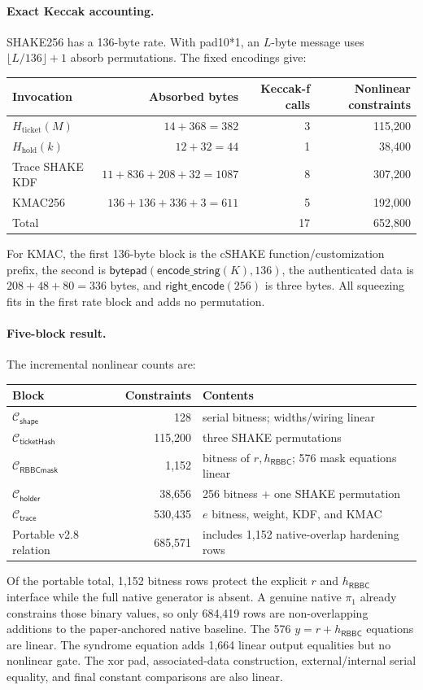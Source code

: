 \documentclass[11pt]{article}
\newcommand{\RBBC}{\mathsf{RBBC}}
\begin{document}
\paragraph{Exact Keccak accounting.}
SHAKE256 has a 136-byte rate.  With pad10*1, an $L$-byte message uses
$\lfloor L/136\rfloor+1$ absorb permutations.  The fixed encodings give:
\begin{center}
\begin{tabular}{lrrr}
\toprule
Invocation & Absorbed bytes & Keccak-f calls & Nonlinear constraints\\
\midrule
$H_{\mathrm{ticket}}(M)$ & $14+368=382$ & 3 & 115,200\\
$H_{\mathrm{hold}}(k)$ & $12+32=44$ & 1 & 38,400\\
Trace SHAKE KDF & $11+836+208+32=1087$ & 8 & 307,200\\
KMAC256 & $136+136+336+3=611$ & 5 & 192,000\\
\midrule
Total & & 17 & 652,800\\
\bottomrule
\end{tabular}
\end{center}
For KMAC, the first 136-byte block is the cSHAKE function/customization prefix,
the second is $\mathsf{bytepad}(\mathsf{encode\_string}(K),136)$, the
authenticated data is $208+48+80=336$ bytes, and
$\mathsf{right\_encode}(256)$ is three bytes.  All squeezing fits in the first
rate block and adds no permutation.

\paragraph{Five-block result.}
The incremental nonlinear counts are:
\begin{center}
\begin{tabular}{lrl}
\toprule
Block & Constraints & Contents\\
\midrule
$\mathcal C_{\mathsf{shape}}$ & 128 & serial bitness; widths/wiring linear\\
$\mathcal C_{\mathsf{ticketHash}}$ & 115,200 & three SHAKE permutations\\
$\mathcal C_{\mathsf{RBBCmask}}$ & 1,152 & bitness of $r,h_{\RBBC}$; 576 mask equations linear\\
$\mathcal C_{\mathsf{holder}}$ & 38,656 & 256 bitness + one SHAKE permutation\\
$\mathcal C_{\mathsf{trace}}$ & 530,435 & $e$ bitness, weight, KDF, and KMAC\\
\midrule
Portable v2.8 relation & 685,571 & includes 1,152 native-overlap hardening rows\\
\bottomrule
\end{tabular}
\end{center}
Of the portable total, 1,152 bitness rows protect the explicit $r$ and
$h_{\RBBC}$ interface while the full native generator is absent.  A genuine native
$\pi_1$ already constrains those binary values, so only 684,419 rows are
non-overlapping additions to the paper-anchored native baseline.  The 576
$y=r+h_{\RBBC}$ equations are linear.
The syndrome equation adds 1,664 linear output equalities but no nonlinear
gate.  The xor pad, associated-data construction, external/internal serial
equality, and final constant comparisons are also linear.
\end{document}
